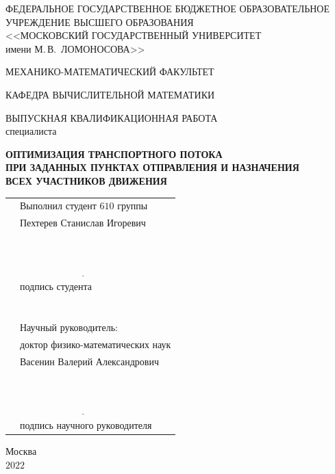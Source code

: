 \documentclass[12pt, a4paper]{article}
\begin{document}
\pagestyle{empty}

\begin{center}
	ФЕДЕРАЛЬНОЕ ГОСУДАРСТВЕННОЕ БЮДЖЕТНОЕ ОБРАЗОВАТЕЛЬНОЕ\\
	УЧРЕЖДЕНИЕ ВЫСШЕГО ОБРАЗОВАНИЯ\\
	<<МОСКОВСКИЙ ГОСУДАРСТВЕННЫЙ УНИВЕРСИТЕТ\\
	имени М.\,В.~ЛОМОНОСОВА>>
\end{center}
\vspace{4pt}
\begin{center}
	МЕХАНИКО-МАТЕМАТИЧЕСКИЙ ФАКУЛЬТЕТ
\end{center}
\vspace{4pt}
\begin{center}
	КАФЕДРА ВЫЧИСЛИТЕЛЬНОЙ МАТЕМАТИКИ
\end{center}
\vspace{1cm}
\begin{center}
	ВЫПУСКНАЯ КВАЛИФИКАЦИОННАЯ РАБОТА\\
	специалиста
\end{center}

\begin{center}
	\textbf{ОПТИМИЗАЦИЯ ТРАНСПОРТНОГО ПОТОКА \\
		    ПРИ ЗАДАННЫХ ПУНКТАХ ОТПРАВЛЕНИЯ И НАЗНАЧЕНИЯ \\
		    ВСЕХ УЧАСТНИКОВ ДВИЖЕНИЯ}
\end{center}
\vspace{1cm}
\begin{center}
	\begin{tabular}{p{9cm} l}
		& Выполнил студент $610$ группы\\
		& Пехтерев Станислав Игоревич\\
		& $\phantom{C_n^k=C_n^{n-k}}$\\
		& $\underline{\phantom{\int\limits_a^bf(x)dx=F(b)-F(a)}}$\\
		& подпись студента\\
		& $\phantom{\int\limits_f(z)dz=0}$\\
		& Научный руководитель:\\
		& доктор физико-математических наук \\
		& Васенин Валерий Александрович\\
		& $\phantom{C_n^k=C_n^{n-k}}$\\
		& $\underline{\phantom{\int\limits_a^bf(x)dx=F(b)-F(a)}}$\\
		& подпись научного руководителя\\
	\end{tabular}
\end{center}
\vspace{1cm}
\begin{center}
	Москва\\
	$2022$
\end{center}
\end{document}
